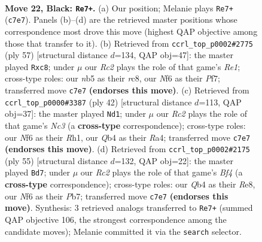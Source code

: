 \documentclass[11pt]{article}
\begin{document}
\clearpage

\begin{figure}[p]\centering
\begin{subfigure}{0.46\textwidth}\centering
\resizebox{\linewidth}{!}{%
\newchessgame
\chessboard[
  setfen={rnb3k1/2r2p2/Pp3np1/1N1p2Np/Pq1P1P1P/R2BK1P1/8/3Q3R b - - 4 22},
  showmover=false,
  pgfstyle=straightmove, color=movearrow, markmove={c7-e7}
]}
\caption{}
\end{subfigure}\hfill
\begin{subfigure}{0.46\textwidth}\centering
\resizebox{\linewidth}{!}{%
\newchessgame
\chessboard[
  setfen={2R1r1k1/3q1pb1/bp4p1/p2p3p/P2Nn2P/1P2PBP1/1B3PK1/3RQ3 b - - 0 29},
  showmover=false,
  pgfstyle=straightmove, color=movearrow, markmove={e8-c8}
]}
\caption{}
\end{subfigure}
\\[4pt]
\begin{subfigure}{0.46\textwidth}\centering
\resizebox{\linewidth}{!}{%
\newchessgame
\chessboard[
  setfen={rq2r1k1/3p1pp1/p4b1p/2pP1Q2/RnB2P1P/2N1P1P1/1P6/4K2R w K - 1 22},
  showmover=false,
  pgfstyle=straightmove, color=movearrow, markmove={c3-d1}
]}
\caption{}
\end{subfigure}\hfill
\begin{subfigure}{0.46\textwidth}\centering
\resizebox{\linewidth}{!}{%
\newchessgame
\chessboard[
  setfen={4r1k1/1p3nb1/pBpp2p1/5b1p/2P2P1q/1P2NB1P/P2Q2P1/5RK1 b - - 1 28},
  showmover=false,
  pgfstyle=straightmove, color=movearrow, markmove={f5-d7}
]}
\caption{}
\end{subfigure}
\caption{\textbf{Move 22, Black: \texttt{Re7+}.} (a) Our position; Melanie plays \texttt{Re7+} (\texttt{c7e7}). Panels (b)--(d) are the retrieved master positions whose correspondence most drove this move (highest QAP objective among those that transfer to it). (b) Retrieved from \texttt{ccrl\_top\_p0002\#2775} (ply 57) [structural distance $d$=134, QAP obj=47]: the master played \texttt{Rxc8}; under $\mu$ our \emph{Rc2} plays the role of that game's \emph{Re1}; cross-type roles: our \emph{n}b5 as their \emph{r}c8, our \emph{N}f6 as their \emph{P}f7; transferred move \texttt{c7e7} \textbf{(endorses this move)}. (c) Retrieved from \texttt{ccrl\_top\_p0000\#3387} (ply 42) [structural distance $d$=113, QAP obj=37]: the master played \texttt{Nd1}; under $\mu$ our \emph{Rc2} plays the role of that game's \emph{Nc3} (a \textbf{cross-type} correspondence); cross-type roles: our \emph{N}f6 as their \emph{R}h1, our \emph{Q}b4 as their \emph{R}a4; transferred move \texttt{c7e7} \textbf{(endorses this move)}. (d) Retrieved from \texttt{ccrl\_top\_p0002\#2175} (ply 55) [structural distance $d$=132, QAP obj=22]: the master played \texttt{Bd7}; under $\mu$ our \emph{Rc2} plays the role of that game's \emph{Bf4} (a \textbf{cross-type} correspondence); cross-type roles: our \emph{Q}b4 as their \emph{R}e8, our \emph{N}f6 as their \emph{P}b7; transferred move \texttt{c7e7} \textbf{(endorses this move)}. Synthesis: 3 retrieved analogs transferred to \texttt{Re7+} (summed QAP objective 106, the strongest correspondence among the candidate moves); Melanie committed it via the \texttt{search} selector.}
\label{fig:thought-m43}
\end{figure}
\end{document}
